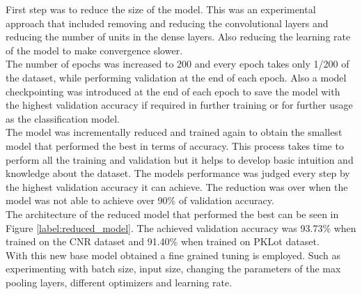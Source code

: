 \documentclass[thesis=M,english]{FITthesis}[2019/03/06]
\begin{document}
First step was to reduce the size of the model. This was an experimental approach that included removing and reducing the convolutional layers and reducing the number of units in the dense layers. Also reducing the learning rate of the model to make convergence slower. \\

The number of epochs was increased to 200 and every epoch takes only 1/200 of the dataset, while performing validation at the end of each epoch.  Also a model checkpointing was introduced at the end of each epoch to save the model with the highest validation accuracy if required in further training or for further usage as the classification model.\\

The model was incrementally reduced and trained again to obtain the smallest model that performed the best in terms of accuracy. This process takes time to perform all the training and validation but it helps to develop basic intuition and knowledge about the dataset. The models performance was judged every step by the highest validation accuracy it can achieve. The reduction was over when the model was not able to achieve over 90\% of validation accuracy.\\

The architecture of the reduced model that performed the best can be seen in Figure \ref{label:reduced_model}. The achieved validation accuracy was 93.73\% when trained on the CNR dataset and 91.40\% when trained on PKLot dataset.\\

With this new base model obtained a fine grained tuning is employed. Such as experimenting with batch size, input size, changing the parameters of the max pooling layers, different optimizers and learning rate.
\end{document}
